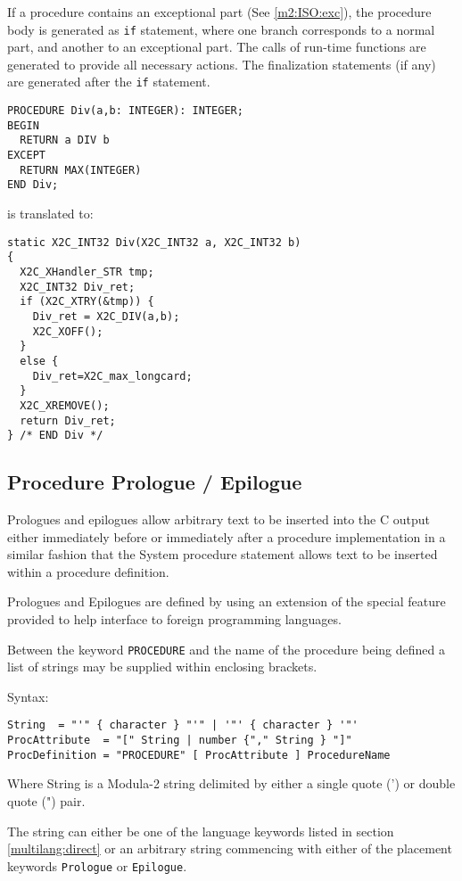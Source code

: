 If  a procedure contains an exceptional part (See \ref{m2:ISO:exc}),
the  procedure body is generated as {\tt if} statement, where one
branch  corresponds  to  a normal  part, and another to an exceptional
part.  The  calls  of run-time functions are generated to provide
all  necessary actions. The finalization statements (if any) are
generated after the {\tt if} statement.
\begin{verbatim}
PROCEDURE Div(a,b: INTEGER): INTEGER;
BEGIN
  RETURN a DIV b
EXCEPT
  RETURN MAX(INTEGER)
END Div;
\end{verbatim}
is translated to:
\begin{verbatim}
static X2C_INT32 Div(X2C_INT32 a, X2C_INT32 b)
{
  X2C_XHandler_STR tmp;
  X2C_INT32 Div_ret;
  if (X2C_XTRY(&tmp)) {
    Div_ret = X2C_DIV(a,b);
    X2C_XOFF();
  }
  else {
    Div_ret=X2C_max_longcard;
  }
  X2C_XREMOVE();
  return Div_ret;
} /* END Div */
\end{verbatim}


\subsection{Procedure Prologue / Epilogue}

Prologues and epilogues allow arbitrary text to be inserted into 
the C output either immediately before or immediately after a procedure
implementation in a similar fashion that the System procedure 
statement allows text to be inserted within a procedure definition.

Prologues and Epilogues are defined by using an extension of 
the special feature provided to help interface to foreign programming languages.

Between the keyword {\tt PROCEDURE} and the name of the procedure being
defined a list of strings may be supplied within enclosing brackets.

Syntax:

\begin{verbatim}
String  = "'" { character } "'" | '"' { character } '"'
ProcAttribute  = "[" String | number {"," String } "]"
ProcDefinition = "PROCEDURE" [ ProcAttribute ] ProcedureName
\end{verbatim}

Where String is a Modula-2 string delimited by either a single quote
(') or double quote (") pair.

The string can either be one of the language keywords listed in
section \ref{multilang:direct} or an arbitrary string commencing with either
of the placement keywords {\tt Prologue} or {\tt Epilogue}.

